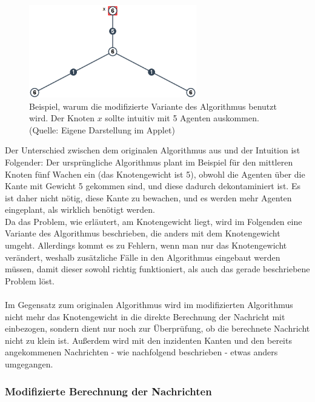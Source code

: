 		\begin{figure}[htb]
			\includegraphics[width=0.65\textwidth]{bilder/abb_paper_problem.png}
			\captionsetup{width=0.65\textwidth}
			\caption{Beispiel, warum die modifizierte Variante des Algorithmus benutzt wird. Der Knoten $x$ sollte intuitiv mit 5 Agenten auskommen. (Quelle: Eigene Darstellung im Applet)}
			\label{fig:negBeispielPaperAlgo}
		\end{figure}

Der Unterschied zwischen dem originalen Algorithmus aus \cite{cima_paper} und der Intuition ist Folgender: Der ursprüngliche Algorithmus plant im Beispiel für den mittleren Knoten fünf Wachen ein (das Knotengewicht ist 5), obwohl die Agenten über die Kante mit Gewicht 5 gekommen sind, und diese dadurch dekontaminiert ist. Es ist daher nicht nötig, diese Kante zu bewachen, und es werden mehr Agenten eingeplant, als wirklich benötigt werden.
\\
Da das Problem, wie erläutert, am Knotengewicht liegt, wird im Folgenden eine Variante des Algorithmus beschrieben, die anders mit dem Knotengewicht umgeht. Allerdings kommt es zu Fehlern, wenn man nur das Knotengewicht verändert, weshalb zusätzliche Fälle in den Algorithmus eingebaut werden müssen, damit dieser sowohl richtig funktioniert, als auch das gerade beschriebene Problem löst.
\\
\\
Im Gegensatz zum originalen Algorithmus \cite{cima_paper} wird im modifizierten Algorithmus nicht mehr das Knotengewicht in die direkte Berechnung der Nachricht mit einbezogen, sondern dient nur noch zur Überprüfung, ob die berechnete Nachricht nicht zu klein ist. Außerdem wird mit den inzidenten Kanten und den bereits angekommenen Nachrichten - wie nachfolgend beschrieben - etwas anders umgegangen.

\subsubsection{Modifizierte Berechnung der Nachrichten}

